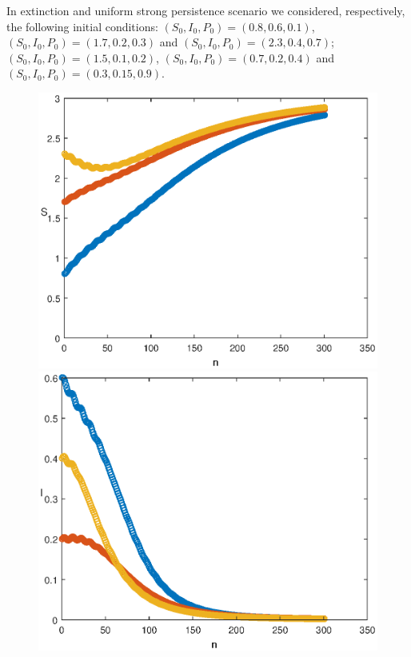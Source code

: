 \documentclass[reqno]{amsart}
\begin{document}
{{In extinction and uniform strong persistence scenario we considered, respectively, the following initial conditions: $(S_0,I_0,P_0)=(0.8,0.6,0.1)$, $(S_0,I_0,P_0)=(1.7,0.2,0.3)$ and $(S_0,I_0,P_0)=(2.3,0.4,0.7)$; $(S_0,I_0,P_0)=(1.5,0.1,0.2)$, $(S_0,I_0,P_0)=(0.7,0.2,0.4)$ and $(S_0,I_0,P_0)=(0.3,0.15,0.9)$.
\begin{figure}
  \begin{minipage}[b]{.32\linewidth}
    \includegraphics[width=\linewidth]{Susceptible_EXT_NZT.eps}
  \end{minipage}
  \begin{minipage}[b]{.32\linewidth}
        \includegraphics[width=\linewidth]{Infected_EXT_NZT.eps}

\end{minipage}
\end{figure}}}
\end{document}
